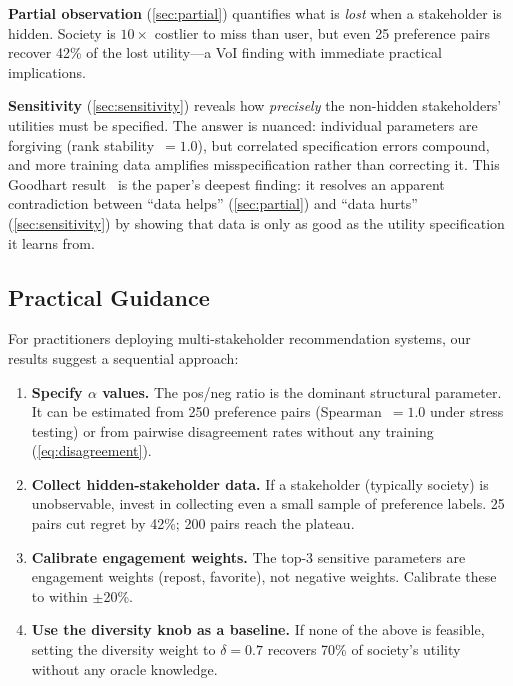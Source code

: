 \documentclass[11pt,letterpaper]{article}
\begin{document}
\textbf{Partial observation} (\cref{sec:partial}) quantifies what is
\emph{lost} when a stakeholder is hidden. Society is $10\times$
costlier to miss than user, but even 25 preference pairs recover 42\%
of the lost utility---a VoI finding with immediate practical
implications.

\textbf{Sensitivity} (\cref{sec:sensitivity}) reveals how \emph{precisely} the
non-hidden stakeholders' utilities must be specified. The answer is
nuanced: individual parameters are forgiving (rank stability~$= 1.0$),
but correlated specification errors compound, and more training data
amplifies misspecification rather than correcting it. This Goodhart
result~\cite{skalse2024goodhart} is the paper's deepest finding: it
resolves an apparent contradiction between ``data helps''
(\cref{sec:partial}) and ``data hurts'' (\cref{sec:sensitivity}) by
showing that data is only as good as the utility specification it
learns from.

\subsection{Practical Guidance}

For practitioners deploying multi-stakeholder recommendation systems,
our results suggest a sequential approach:

\begin{enumerate}
  \item \textbf{Specify $\alpha$ values.} The pos/neg ratio is the
    dominant structural parameter. It can be estimated from 250
    preference pairs (Spearman~$= 1.0$ under stress testing) or from
    pairwise disagreement rates without any training
    (\cref{eq:disagreement}).
  \item \textbf{Collect hidden-stakeholder data.} If a stakeholder
    (typically society) is unobservable, invest in collecting even a
    small sample of preference labels. 25 pairs cut regret by 42\%;
    200 pairs reach the plateau.
  \item \textbf{Calibrate engagement weights.} The top-3 sensitive
    parameters are engagement weights (repost, favorite), not negative
    weights. Calibrate these to within $\pm$20\%.
  \item \textbf{Use the diversity knob as a baseline.} If none of the
    above is feasible, setting the diversity weight to $\delta = 0.7$
    recovers 70\% of society's utility without any oracle knowledge.
\end{enumerate}
\end{document}
